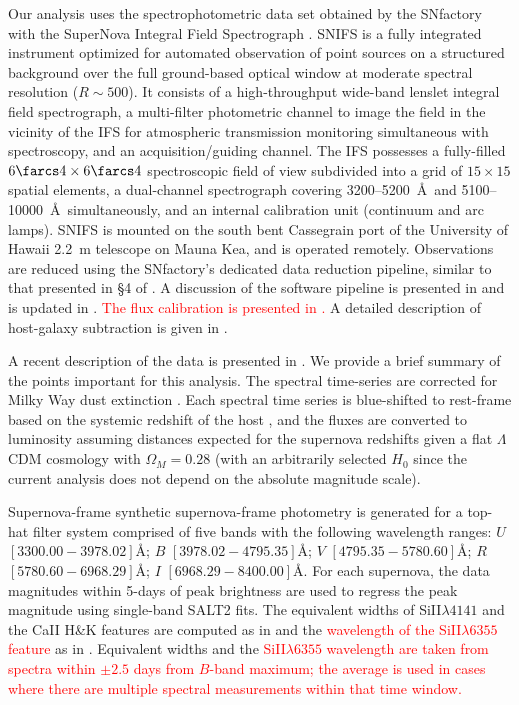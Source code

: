 \documentclass{aastex61}   	%
\begin{document}
Our analysis uses the spectrophotometric data set obtained by
the SNfactory with the SuperNova Integral Field
Spectrograph \citep[SNIFS,][]{2004SPIE.5249..146L}.  SNIFS is a fully integrated
instrument optimized for automated observation of point sources on a
structured background over the full ground-based optical window at
moderate spectral resolution ($R \sim 500$).  It consists of a
high-throughput wide-band lenslet integral field spectrograph, a
multi-filter photometric channel to image the field in the vicinity of
the IFS for atmospheric transmission monitoring simultaneous with
spectroscopy, and an acquisition/guiding channel.  The IFS possesses a
fully-filled $6\farcs 4 \times 6\farcs 4$ spectroscopic field of view
subdivided into a grid of $15 \times 15$ spatial elements, a
dual-channel spectrograph covering 3200--5200~\AA\ and 5100--10000~\AA\
simultaneously, and an internal calibration unit (continuum and arc
lamps).  SNIFS is mounted on the south bent Cassegrain port of the
University of Hawaii 2.2~m telescope on Mauna Kea, and is operated
remotely.  Observations are reduced using the SNfactory's dedicated data
reduction pipeline, similar to that presented in \S4 of \citet{2001MNRAS.326...23B}.
A discussion of the software pipeline is presented in
\citet{2006ApJ...650..510A} and is updated in \citet{2010ApJ...713.1073S}. 
\textcolor{red}{The flux calibration is presented in \citet{2013A&A...549A...8B}. }
A detailed
description of host-galaxy subtraction is given in \citet{2011MNRAS.418..258B}.

A recent description of the data is presented in \citet{2015ApJ...815...58F}.
We provide a brief summary of the points important for this analysis.
The spectral time-series  are corrected for Milky Way dust
extinction \citep{1989ApJ...345..245C,1998ApJ...500..525S}.  
Each spectral time series is
blue-shifted to rest-frame
based on the systemic redshift of the host \citep[c.f.][]{2013ApJ...770..107C}, and the fluxes are converted to luminosity assuming
distances expected for the supernova redshifts given a flat
$\Lambda$CDM cosmology with $\Omega_M = 0.28$ (with an arbitrarily selected
$H_0$ since the current analysis does not depend on the absolute magnitude scale).

Supernova-frame synthetic supernova-frame photometry is generated for a top-hat filter system
comprised of five 
\color{red}
bands with the following wavelength ranges: $U$ $[3300.00 - 3978.02]$\AA;
$B$ $[3978.02-4795.35]$\AA;
$V$ $[4795.35-5780.60]$\AA;
$R$ $[5780.60-6968.29]$\AA;
$I$ $[6968.29-8400.00]$\AA.
For each supernova, the data magnitudes within 5-days of peak brightness are used to regress the peak magnitude
using single-band SALT2 fits.
\color{black}
The equivalent widths of SiII$\lambda 4141$ and the CaII H\&K features are computed as
in \citet{2008A&A...477..717B} and the 
\textcolor{red}{wavelength of the SiII$\lambda 6355$ feature}
as in \citet{chotard:thesis}.
Equivalent widths and the
\textcolor{red}{SiII$\lambda 6355$ wavelength are taken from spectra  within $\pm 2.5$ days from $B$-band maximum;
the average is used  in cases where there are multiple spectral measurements within that time window.}
\end{document}

